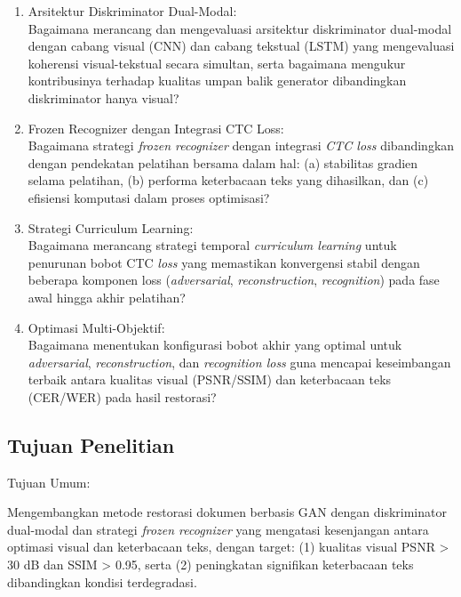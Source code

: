 \begin{enumerate}[leftmargin=1.5em, labelsep=0.5em, itemindent=0pt, noitemsep, topsep=0pt]
      \item Arsitektur Diskriminator Dual-Modal: \\
            Bagaimana merancang dan mengevaluasi arsitektur diskriminator dual-modal dengan cabang visual (CNN) dan cabang tekstual (LSTM) yang mengevaluasi koherensi visual-tekstual secara simultan, serta bagaimana mengukur kontribusinya terhadap kualitas umpan balik generator dibandingkan diskriminator hanya visual?

      \item Frozen Recognizer dengan Integrasi CTC Loss: \\
            Bagaimana strategi \textit{frozen recognizer} dengan integrasi \textit{CTC loss} dibandingkan dengan pendekatan pelatihan bersama dalam hal: (a) stabilitas gradien selama pelatihan, (b) performa keterbacaan teks yang dihasilkan, dan (c) efisiensi komputasi dalam proses optimisasi?

      \item Strategi Curriculum Learning: \\
            Bagaimana merancang strategi temporal \textit{curriculum learning} untuk penurunan bobot CTC \textit{loss} yang memastikan konvergensi stabil dengan beberapa komponen loss (\textit{adversarial}, \textit{reconstruction}, \textit{recognition}) pada fase awal hingga akhir pelatihan?

      \item Optimasi Multi-Objektif: \\
            Bagaimana menentukan konfigurasi bobot akhir yang optimal untuk \textit{adversarial}, \textit{reconstruction}, dan \textit{recognition loss} guna mencapai keseimbangan terbaik antara kualitas visual (PSNR/SSIM) dan keterbacaan teks (CER/WER) pada hasil restorasi?
\end{enumerate}

\subsection{Tujuan Penelitian}
\label{subsec:tujuan-penelitian}

Tujuan Umum:

Mengembangkan metode restorasi dokumen berbasis GAN dengan diskriminator dual-modal dan strategi \textit{frozen recognizer} yang mengatasi kesenjangan antara optimasi visual dan keterbacaan teks, dengan target: (1) kualitas visual PSNR > 30 dB dan SSIM > 0.95, serta (2) peningkatan signifikan keterbacaan teks dibandingkan kondisi terdegradasi.

